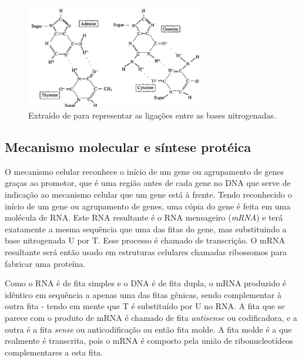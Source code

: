 \begin{figure}[h]
    \centering
    \includegraphics[width=0.7\textwidth]{images/pair-watson-crick.png}
    \caption{Extraído de \cite{nucleic-acid} para representar as ligações entre as bases nitrogenadas. }
    \label{fig:pair-watson-crick}
\end{figure}

\subsection{Mecanismo molecular e síntese protéica}

O mecanismo celular reconhece o início de um gene ou agrupamento de genes graças ao promotor, que
é uma região antes de cada gene no DNA que serve de indicação ao mecanismo celular que um gene está à frente. Tendo reconhecido o início de um gene ou agrupamento de genes, uma cópia do gene é feita em uma molécula de RNA. Este RNA resultante é o RNA mensageiro (\textit{mRNA}) e terá exatamente a mesma sequência que uma das fitas do gene, mas substituindo a base nitrogenada U por T. Esse processo é chamado de transcrição. O mRNA resultante será então usado em estruturas celulares chamadas ribossomos para fabricar uma proteína. 

Como o RNA é de fita simples e o DNA é de fita dupla, o mRNA produzido é idêntico em sequência a apenas uma das fitas gênicas, sendo complementar à outra fita - tendo em mente que T é substituído por U no RNA. A fita que se parece com o produto de mRNA é chamado de fita \textit{antisense} ou codificadora, e a outra é a fita \textit{sense} ou anticodificação ou então fita molde. A fita molde é a que realmente é transcrita, pois o mRNA é composto pela união de ribonucleotídeos complementares a esta fita.

